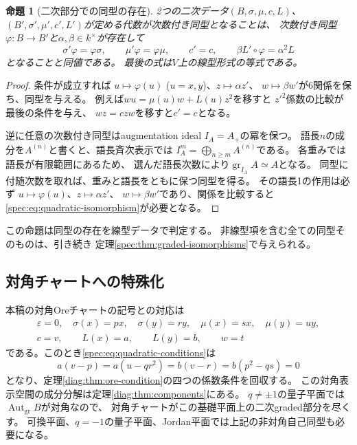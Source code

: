 \documentclass[11pt,a4paper]{ltjsarticle}
\newtheorem{proposition}[theorem]{命題}
\theoremstyle{definition}
\newcommand{\Aut}{\operatorname{Aut}}
\newcommand{\gr}{\operatorname{gr}}
\begin{document}
\begin{proposition}[二次部分での同型の存在]\label{spec:prop:quadratic-isomorphisms}
2つの二次データ$(B,\sigma,\mu,c,L)$、
$(B',\sigma',\mu',c',L')$が定める代数が次数付き同型となることは、
次数付き同型$\varphi:B\to B'$と$\alpha,\beta\in k^\times$が存在して
\begin{equation}\label{spec:eq:quadratic-isomorphism}
\sigma'\varphi=\varphi\sigma,\qquad
\mu'\varphi=\varphi\mu,\qquad
c'=c,\qquad
\beta L'\circ\varphi=\alpha^2L
\end{equation}
となることと同値である。
最後の式は$V$上の線型形式の等式である。
\end{proposition}
\begin{proof}
条件が成立すれば
$u\mapsto\varphi(u)$ ($u=x,y$)、$z\mapsto\alpha z'$、
$w\mapsto\beta w'$が6関係を保ち、同型を与える。
例えば$wu=\mu(u)w+L(u)z^2$を移すと
$z'^2$係数の比較が最後の条件を与え、
$wz=czw$を移すと$c'=c$となる。

逆に任意の次数付き同型はaugmentation ideal $I_A=A_+$の冪を保つ。
語長$n$の成分を$A^{(n)}$と書くと、語長斉次表示では
$I_A^m=\bigoplus_{n\geq m}A^{(n)}$である。
各重みでは語長が有限範囲にあるため、
選んだ語長次数により$\gr_{I_A}A\simeq A$となる。
同型に付随次数を取れば、重みと語長をともに保つ同型を得る。
その語長1の作用は必ず
$u\mapsto\varphi(u)$、$z\mapsto\alpha z'$、
$w\mapsto\beta w'$であり、関係を比較すると
\eqref{spec:eq:quadratic-isomorphism}が必要となる。
\end{proof}

この命題は同型の存在を線型データで判定する。
非線型項を含む全ての同型そのものは、引き続き
定理\ref{spec:thm:graded-isomorphisms}で与えられる。

\subsection{対角チャートへの特殊化}
本稿の対角Oreチャートの記号との対応は
\[
\begin{gathered}
\varepsilon=0,\quad \sigma(x)=px,\quad \sigma(y)=ry,\quad
\mu(x)=sx,\quad \mu(y)=uy,\\
c=v,\qquad L(x)=a,\qquad L(y)=b,\qquad w=t
\end{gathered}
\]
である。このとき\eqref{spec:eq:quadratic-conditions}は
\[
a(v-p)=a(u-qr^2)=b(v-r)=b(p^2-qs)=0
\]
となり、定理\ref{diag:thm:ore-condition}の四つの係数条件を回収する。
この対角表示空間の成分分解は定理\ref{diag:thm:components}にある。
$q\ne\pm1$の量子平面では$\Aut_{\mathrm{gr}}B$が対角なので、
対角チャートがこの基礎平面上の二次graded部分を尽くす。
可換平面、$q=-1$の量子平面、Jordan平面では上記の非対角自己同型も必要になる。
\end{document}
